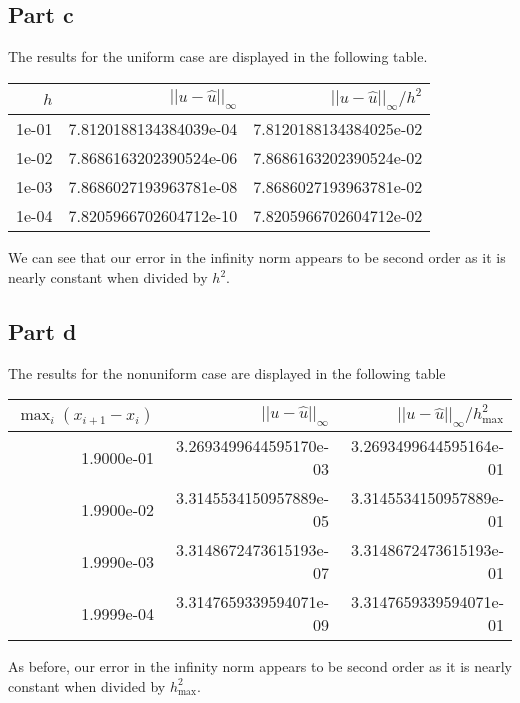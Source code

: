 \documentclass{article}
\begin{document}
\subsection{Part c}
The results for the uniform case are displayed in the following table.
\begin{center}
\begin{table}[H]
\begin{tabular}{|r|r|r|}\hline
{$h$}&{$||u-\hat{u}||_\infty$}&{$||u-\hat{u}||_\infty/h^2$}\\\hline
1e-01 &7.8120188134384039e-04 &7.8120188134384025e-02\\
1e-02 &7.8686163202390524e-06 &7.8686163202390524e-02 \\
1e-03 &7.8686027193963781e-08 &7.8686027193963781e-02\\
1e-04 &7.8205966702604712e-10 &7.8205966702604712e-02\\\hline
\end{tabular}
\end{table}
\end{center}
We can see that our error in the infinity norm appears to be second order as it is nearly constant when divided by $h^2$. 

\subsection{Part d}
The results for the nonuniform case are displayed in the following table
\begin{table}[H]\centering
\begin{tabular}{|r|r|r|}\hline
{$\max_i ( x_{i+1} - x_i )$}&{$||u-\hat{u}||_\infty$}&{$||u-\hat{u}||_\infty/h_{\text{max}}^2$}\\\hline
1.9000e-01 &3.2693499644595170e-03 &3.2693499644595164e-01\\
1.9900e-02 &3.3145534150957889e-05 &3.3145534150957889e-01 \\
1.9990e-03 &3.3148672473615193e-07 &3.3148672473615193e-01\\
1.9999e-04 &3.3147659339594071e-09 &3.3147659339594071e-01\\\hline
\end{tabular}
\end{table}
As before, our error in the infinity norm appears to be second order as it is nearly constant when divided by $h_{\text{max}}^2$.
\end{document}
